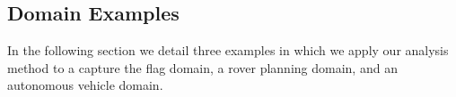 \documentclass[letterpaper, 10 pt, conference]{ieeeconf}  %
\theoremstyle{definition}
\begin{document}
\subsection{Domain Examples}
In the following section we detail three examples in which we apply our analysis method to a capture the flag domain, a rover planning domain, and an autonomous vehicle domain. 
\begin{enumerate}


\end{enumerate}
\end{document}
